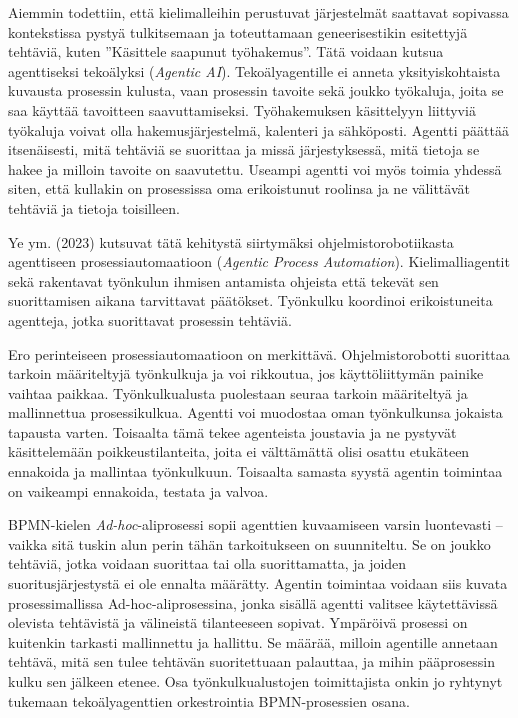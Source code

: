 \documentclass[
  finnish,
  letterpaper,
  DIV=11,
  numbers=noendperiod,
  oneside]{scrreprt}
\begin{document}
Aiemmin todettiin, että kielimalleihin perustuvat järjestelmät saattavat
sopivassa kontekstissa pystyä tulkitsemaan ja toteuttamaan
geneerisestikin esitettyjä tehtäviä, kuten ''Käsittele saapunut
työhakemus''. Tätä voidaan kutsua agenttiseksi tekoälyksi (\emph{Agentic
AI}). Tekoälyagentille ei anneta yksityiskohtaista kuvausta prosessin
kulusta, vaan prosessin tavoite sekä joukko työkaluja, joita se saa
käyttää tavoitteen saavuttamiseksi. Työhakemuksen käsittelyyn liittyviä
työkaluja voivat olla hakemusjärjestelmä, kalenteri ja sähköposti.
Agentti päättää itsenäisesti, mitä tehtäviä se suorittaa ja missä
järjestyksessä, mitä tietoja se hakee ja milloin tavoite on saavutettu.
Useampi agentti voi myös toimia yhdessä siten, että kullakin on
prosessissa oma erikoistunut roolinsa ja ne välittävät tehtäviä ja
tietoja toisilleen.

Ye ym. (2023) kutsuvat tätä kehitystä siirtymäksi ohjelmistorobotiikasta
agenttiseen prosessiautomaatioon (\emph{Agentic Process Automation}).
Kielimalliagentit sekä rakentavat työnkulun ihmisen antamista ohjeista
että tekevät sen suorittamisen aikana tarvittavat päätökset. Työnkulku
koordinoi erikoistuneita agentteja, jotka suorittavat prosessin
tehtäviä.

Ero perinteiseen prosessiautomaatioon on merkittävä. Ohjelmistorobotti
suorittaa tarkoin määriteltyjä työnkulkuja ja voi rikkoutua, jos
käyttöliittymän painike vaihtaa paikkaa. Työnkulkualusta puolestaan
seuraa tarkoin määriteltyä ja mallinnettua prosessikulkua. Agentti voi
muodostaa oman työnkulkunsa jokaista tapausta varten. Toisaalta tämä
tekee agenteista joustavia ja ne pystyvät käsittelemään
poikkeustilanteita, joita ei välttämättä olisi osattu etukäteen
ennakoida ja mallintaa työnkulkuun. Toisaalta samasta syystä agentin
toimintaa on vaikeampi ennakoida, testata ja valvoa.

BPMN-kielen \emph{Ad-hoc}-aliprosessi sopii agenttien kuvaamiseen varsin
luontevasti -- vaikka sitä tuskin alun perin tähän tarkoitukseen on
suunniteltu. Se on joukko tehtäviä, jotka voidaan suorittaa tai olla
suorittamatta, ja joiden suoritusjärjestystä ei ole ennalta määrätty.
Agentin toimintaa voidaan siis kuvata prosessimallissa
Ad-hoc-aliprosessina, jonka sisällä agentti valitsee käytettävissä
olevista tehtävistä ja välineistä tilanteeseen sopivat. Ympäröivä
prosessi on kuitenkin tarkasti mallinnettu ja hallittu. Se määrää,
milloin agentille annetaan tehtävä, mitä sen tulee tehtävän
suoritettuaan palauttaa, ja mihin pääprosessin kulku sen jälkeen etenee.
Osa työnkulkualustojen toimittajista onkin jo ryhtynyt tukemaan
tekoälyagenttien orkestrointia BPMN-prosessien osana.
\end{document}
